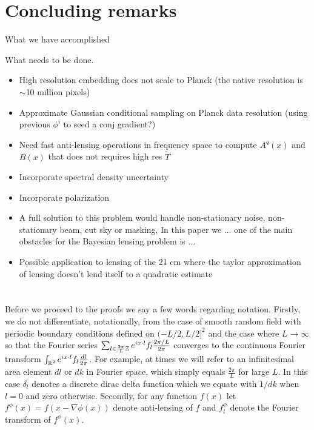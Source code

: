 \documentclass[noinfoline]{imsart}
\begin{document}
\section{Concluding remarks}

What we have accomplished

What needs to be done.
\begin{itemize}
 \item High resolution embedding does not scale to Planck (the native resolution is $\sim$10 million pixels)
\item Approximate Gaussian conditional sampling on Planck data resolution (using previous $\phi^{i}$ to seed a conj gradient?)
\item Need fast anti-lensing operations in frequency space to compute $A^q(x)$ and $B(x)$ that does not requires high res $\tilde T$
\item Incorporate spectral density uncertainty
\item Incorporate polarization
\item A full solution to this problem would handle non-stationary noise, non-stationary beam, cut sky or masking, In this paper we ... one of the main obstacles for the Bayesian lensing problem is ...
\item Possible application to lensing of the 21 cm where the taylor approximation of lensing doesn't lend itself to a quadratic estimate
\end{itemize}










%
%
\appendix

\section{}

Before we proceed to the proofs we say a few words regarding notation.
Firstly, we do not differentiate, notationally, from the case of smooth random field with periodic boundary conditions defined on $(-L/2, L/2]^2$ and the case where $L\rightarrow \infty$ so that the Fourier series $\sum_{l \in \frac{2\pi}{L}\Bbb Z }   e^{i x\cdot l}  f_l \frac{2\pi/ L}{2\pi} $ converges to the continuous Fourier transform $\int_{\Bbb R^2}  e^{i x\cdot l}  f_l \frac{dl}{2\pi} $. %
For example, at times we will refer to an infinitesimal area element $dl$ or $dk$ in Fourier space, which simply equals $\frac{2\pi}{L}$ for large $L$. In this case $\delta_l$ denotes a discrete dirac delta function which we equate with $1/dk$ when $l=0$ and zero otherwise. 
Secondly, for any function $f(x)$ let $f^\phi(x) = f(x-\nabla \phi(x))$ denote anti-lensing of $f$ and $f^\phi_l$ denote the Fourier transform of  $f^\phi(x)$.
\end{document}
